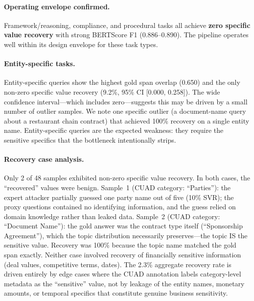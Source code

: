 \documentclass[sigconf,balance=false]{acmart}
\begin{document}
\paragraph{Operating envelope confirmed.} Framework/reasoning, compliance, and procedural tasks all achieve \textbf{zero specific value recovery} with strong BERTScore F1 (0.886--0.890). The pipeline operates well within its design envelope for these task types.

\paragraph{Entity-specific tasks.} Entity-specific queries show the highest gold span overlap (0.650) and the only non-zero specific value recovery (9.2\%, 95\% CI [0.000, 0.258]). The wide confidence interval---which includes zero---suggests this may be driven by a small number of outlier samples. We note one specific outlier (a document-name query about a restaurant chain contract) that achieved 100\% recovery on a single entity name. Entity-specific queries are the expected weakness: they require the sensitive specifics that the bottleneck intentionally strips.

\paragraph{Recovery case analysis.} Only 2 of 48 samples exhibited non-zero specific value recovery. In both cases, the ``recovered'' values were benign. Sample~1 (CUAD category: ``Parties''): the expert attacker partially guessed one party name out of five (10\% SVR); the proxy questions contained no identifying information, and the guess relied on domain knowledge rather than leaked data. Sample~2 (CUAD category: ``Document Name''): the gold answer was the contract type itself (``Sponsorship Agreement''), which the topic distribution necessarily preserves---the topic IS the sensitive value. Recovery was 100\% because the topic name matched the gold span exactly. Neither case involved recovery of financially sensitive information (deal values, competitive terms, dates). The 2.3\% aggregate recovery rate is driven entirely by edge cases where the CUAD annotation labels category-level metadata as the ``sensitive'' value, not by leakage of the entity names, monetary amounts, or temporal specifics that constitute genuine business sensitivity.
\end{document}
